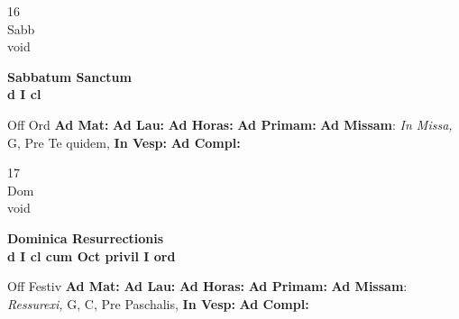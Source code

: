 \documentclass[10pt, openany]{book}
\begin{document}
    \begin{center}
        \begin{minipage}{3.5in}
            \vspace{2em}
            \begin{minipage}{0.5in}
                {\Huge 16} \\
                {\normalsize Sabb} \\
                {\normalsize void}
            \end{minipage}
            \begin{minipage}{3.0in}
                \textbf{ \large Sabbatum Sanctum \\
                \textnormal{\normalsize d I cl}} \\ 
            \end{minipage}
            \begin{justify}Off Ord
                \textbf{Ad Mat: }
                \textbf{Ad Lau: }
                \textbf{Ad Horas: }
                \textbf{Ad Primam: }\textbf{Ad Missam}: \textit{In Missa,} G, Pre Te quidem,  
                \textbf{In Vesp: }
                \textbf{Ad Compl: }
            \end{justify}
        \end{minipage}
    \end{center}

    \begin{center}
        \begin{minipage}{3.5in}
            \vspace{2em}
            \begin{minipage}{0.5in}
                {\Huge 17} \\
                {\normalsize Dom} \\
                {\normalsize void}
            \end{minipage}
            \begin{minipage}{3.0in}
                \textbf{ \large Dominica Resurrectionis \\
                \textnormal{\normalsize d I cl cum Oct privil I ord}} \\ 
            \end{minipage}
            \begin{justify}Off Festiv
                \textbf{Ad Mat: }
                \textbf{Ad Lau: }
                \textbf{Ad Horas: }
                \textbf{Ad Primam: }\textbf{Ad Missam}: \textit{Ressurexi,} G, C, Pre Paschalis,  
                \textbf{In Vesp: }
                \textbf{Ad Compl: }
            \end{justify}
        \end{minipage}
    \end{center}
\end{document}
